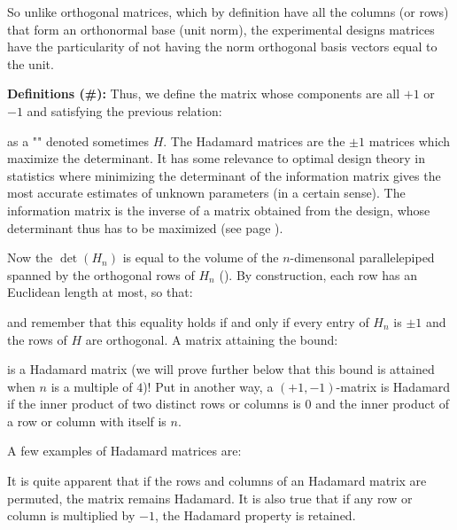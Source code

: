 	So unlike orthogonal matrices, which by definition have all the columns (or rows) that form an orthonormal base (unit norm), the experimental designs matrices have the particularity of not having the norm orthogonal basis vectors equal to the unit.
	
	\textbf{Definitions (\#\mydef):}
	Thus, we define the matrix whose components are all $+1$ or $-1$ and satisfying the previous relation:
		
	as a "" denoted sometimes $H$.  
	The Hadamard matrices are the $\pm 1$ matrices which maximize the determinant. It has some relevance to optimal design theory in statistics where minimizing the determinant of the information matrix gives the most accurate estimates of unknown parameters (in a certain sense). The information matrix is the inverse of a matrix obtained from the design, whose determinant thus has to be maximized (see page \pageref{optimal designs}).
	
	Now the $\det(H_n)$ is equal to the volume of the $n$-dimensonal parallelepiped spanned by the orthogonal rows of $H_n$ (). By construction, each row has an Euclidean length at most, so that:
	
	and remember that this equality holds if and only if every entry of $H_n$ is $\pm 1$ and the rows of $H$ are orthogonal. A matrix attaining the bound:
	
	is a Hadamard matrix (we will prove further below that this bound is attained when $n$ is a multiple of $4$)! Put in another way, a $(+1,-1)$-matrix is Hadamard if the inner product of two distinct rows or columns is $0$ and the inner product of a row or column with itself is $n$.
	
	A few examples of Hadamard matrices are:
	
	It is quite apparent that if the rows and columns of an Hadamard matrix are permuted, the matrix remains Hadamard. It is also true that if any row or column is multiplied by $-1$, the Hadamard property is retained.


